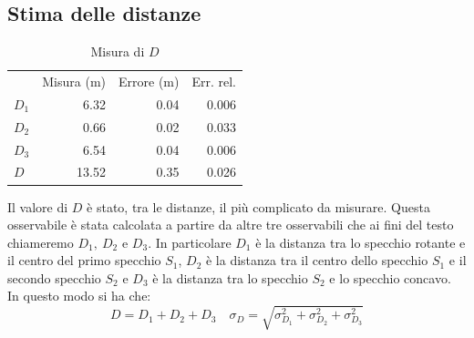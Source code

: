 \documentclass[a4paper,11pt]{article}
\begin{document}
	\subsection{Stima delle distanze}\label{sec:dist}
	
	\begin{table}
		\centering
		\vspace{-1cm}
		\caption{Misura di $D$}
		\vspace{0.1 cm}
		\begin{tabular}{lrrr}
			\rowcolor[rgb]{ .741,  .843,  .933} \multicolumn{1}{r}{} & \multicolumn{1}{l}{Misura (\si{\meter})} & \multicolumn{1}{l}{Errore (\si{\meter})} & \multicolumn{1}{l}{Err. rel.} \\
			\rowcolor[rgb]{ .741,  .843,  .933} $ D_1 $    & \cellcolor[rgb]{ .859,  .859,  .859} 6.32 & \cellcolor[rgb]{ .859,  .859,  .859} 0.04 & \cellcolor[rgb]{ .859,  .859,  .859} 0.006 \\
			\rowcolor[rgb]{ .741,  .843,  .933} $ D_2 $    & \cellcolor[rgb]{ .929,  .929,  .929} 0.66 & \cellcolor[rgb]{ .929,  .929,  .929} 0.02 & \cellcolor[rgb]{ .929,  .929,  .929} 0.033 \\
			\rowcolor[rgb]{ .741,  .843,  .933} $ D_3 $    & \cellcolor[rgb]{ .859,  .859,  .859} 6.54 & \cellcolor[rgb]{ .859,  .859,  .859} 0.04 & \cellcolor[rgb]{ .859,  .859,  .859} 0.006 \\ 
			\rowcolor[rgb]{ .741,  .843,  .933} $ D $     & \cellcolor[rgb]{ .929,  .929,  .929} 13.52 & \cellcolor[rgb]{ .929,  .929,  .929} 0.35 & \cellcolor[rgb]{ .929,  .929,  .929} 0.026 \\
		\end{tabular}%
		\label{tab:D}
	\end{table}%
	Il valore di $ D $ è stato, tra le distanze, il più complicato da misurare. Questa osservabile è stata calcolata a partire da altre tre osservabili che ai fini del testo chiameremo $ D_1,\ D_2 $ e $ D_3 $. In particolare $ D_1 $ è la distanza tra lo specchio rotante e il centro del primo specchio $ S_1 $, $ D_2 $ è la distanza tra il centro dello specchio $ S_1 $ e il secondo specchio $ S_2 $ e $ D_3 $ è la distanza tra lo specchio $ S_2 $ e lo specchio concavo. In questo modo si ha che:
	\begin{equation}\label{eqn:D}
	D = D_1 + D_2 + D_3 \quad \sigma_D = \sqrt{\sigma_{D_1}^2 + \sigma_{D_2}^2 + \sigma_{D_3}^2}
	\end{equation}
	
\end{document}
